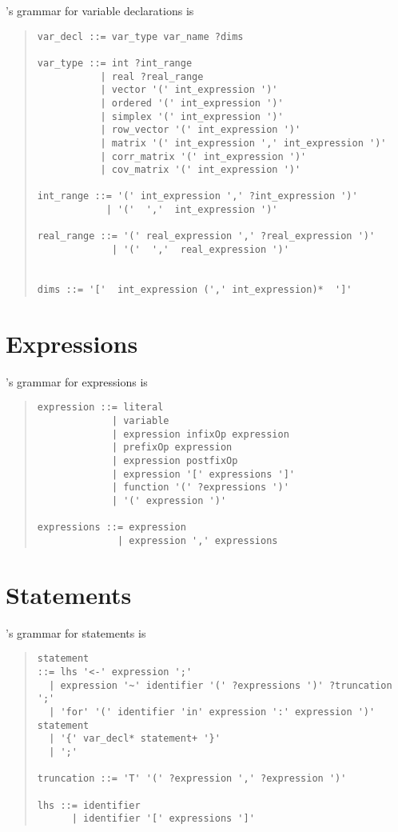 \Stan's grammar for variable declarations is
%
\begin{quote}
\begin{Verbatim}
var_decl ::= var_type var_name ?dims

var_type ::= int ?int_range
           | real ?real_range
           | vector '(' int_expression ')'
           | ordered '(' int_expression ')'
           | simplex '(' int_expression ')'
           | row_vector '(' int_expression ')'
           | matrix '(' int_expression ',' int_expression ')'
           | corr_matrix '(' int_expression ')'
           | cov_matrix '(' int_expression ')'

int_range ::= '(' int_expression ',' ?int_expression ')'
            | '('  ','  int_expression ')'

real_range ::= '(' real_expression ',' ?real_expression ')'
             | '('  ','  real_expression ')'


dims ::= '['  int_expression (',' int_expression)*  ']'
\end{Verbatim}
\end{quote}

\section{Expressions}

\Stan's grammar for expressions is 
%
\begin{quote}
\begin{Verbatim}
expression ::= literal
             | variable
             | expression infixOp expression
             | prefixOp expression
             | expression postfixOp
             | expression '[' expressions ']'
             | function '(' ?expressions ')'
             | '(' expression ')'

expressions ::= expression
              | expression ',' expressions
\end{Verbatim}
\end{quote}

\section{Statements}

\Stan's grammar for statements is
%
\begin{quote}
\begin{Verbatim}
statement 
::= lhs '<-' expression ';'
  | expression '~' identifier '(' ?expressions ')' ?truncation ';'
  | 'for' '(' identifier 'in' expression ':' expression ')' statement
  | '{' var_decl* statement+ '}'
  | ';'

truncation ::= 'T' '(' ?expression ',' ?expression ')' 

lhs ::= identifier
      | identifier '[' expressions ']'

\end{Verbatim}
\end{quote}



